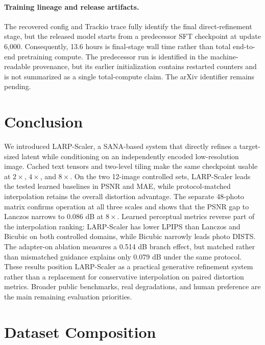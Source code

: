 \documentclass[10pt]{article}
\newcommand{\method}{LARP-Scaler\xspace}
\begin{document}
\paragraph{Training lineage and release artifacts.}
The recovered config and Trackio trace fully identify the final
direct-refinement stage, but the released model starts from a predecessor
SFT checkpoint at update 6,000. Consequently, 13.6 hours is final-stage wall
time rather than total end-to-end pretraining compute. The predecessor run is
identified in the machine-readable provenance, but its earlier initialization
contains restarted counters and is not summarized as a single total-compute
claim. The arXiv identifier remains pending.

\section{Conclusion}

We introduced \method, a SANA-based system that directly refines a target-sized
latent while conditioning on an independently encoded low-resolution image.
Cached text tensors and two-level tiling make the same checkpoint usable at
$2\times$, $4\times$, and $8\times$. On the two 12-image controlled sets,
\method leads the tested learned baselines in PSNR and MAE, while
protocol-matched interpolation retains the overall distortion advantage. The
separate 48-photo matrix confirms operation at all three scales and shows that
the PSNR gap to Lanczos narrows to 0.086 dB at $8\times$. Learned perceptual
metrics reverse part of the interpolation ranking: \method has lower LPIPS
than Lanczos and Bicubic on both controlled domains, while Bicubic narrowly
leads photo DISTS. The adapter-on ablation measures a
0.514 dB branch effect, but matched rather than mismatched guidance explains
only 0.079 dB under the same protocol. These results position \method as a
practical generative refinement system rather than a replacement for
conservative interpolation on paired distortion metrics. Broader public
benchmarks, real degradations, and human preference are the main remaining
evaluation priorities.




\clearpage
\appendix
\onecolumn
\section{Dataset Composition}

\label{app:dataset}
\end{document}
